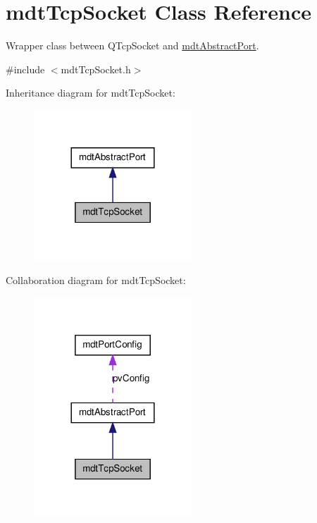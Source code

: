 \hypertarget{classmdt_tcp_socket}{
\section{mdtTcpSocket Class Reference}
\label{classmdt_tcp_socket}
}


Wrapper class between QTcpSocket and \hyperlink{classmdt_abstract_port}{mdtAbstractPort}.  




{\ttfamily \#include $<$mdtTcpSocket.h$>$}



Inheritance diagram for mdtTcpSocket:\nopagebreak
\begin{figure}[H]
\begin{center}
\leavevmode
\includegraphics[width=168pt]{classmdt_tcp_socket__inherit__graph}
\end{center}
\end{figure}


Collaboration diagram for mdtTcpSocket:
\nopagebreak
\begin{figure}[H]
\begin{center}
\leavevmode
\includegraphics[width=168pt]{classmdt_tcp_socket__coll__graph}
\end{center}
\end{figure}
